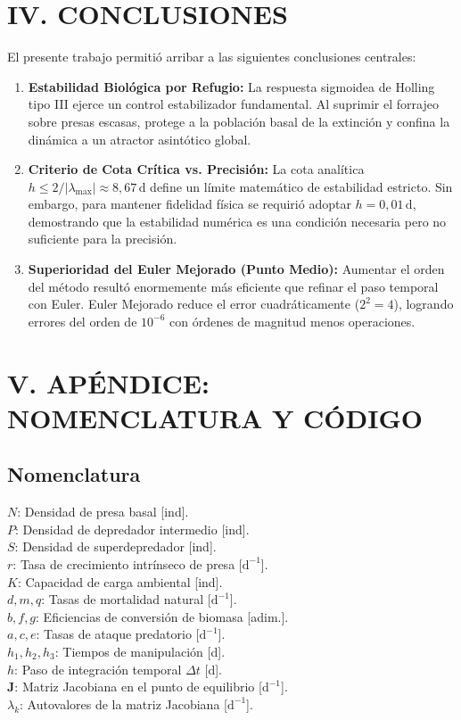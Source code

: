 \documentclass[10pt,twocolumn,a4paper]{article}
\begin{document}
\section{IV. CONCLUSIONES}
El presente trabajo permitió arribar a las siguientes conclusiones centrales:
\begin{enumerate}
  \item \textbf{Estabilidad Biológica por Refugio:} La respuesta sigmoidea de Holling tipo III ejerce un control estabilizador fundamental. Al suprimir el forrajeo sobre presas escasas, protege a la población basal de la extinción y confina la dinámica a un atractor asintótico global.
  \item \textbf{Criterio de Cota Crítica vs. Precisión:} La cota analítica $h \le 2/|\lambda_{\max}| \approx 8{,}67\,\text{d}$ define un límite matemático de estabilidad estricto. Sin embargo, para mantener fidelidad física se requirió adoptar $h = 0{,}01\,\text{d}$, demostrando que la estabilidad numérica es una condición necesaria pero no suficiente para la precisión.
  \item \textbf{Superioridad del Euler Mejorado (Punto Medio):} Aumentar el orden del método resultó enormemente más eficiente que refinar el paso temporal con Euler. Euler Mejorado reduce el error cuadráticamente ($2^2 = 4$), logrando errores del orden de $10^{-6}$ con órdenes de magnitud menos operaciones.
\end{enumerate}

\section{V. APÉNDICE: NOMENCLATURA Y CÓDIGO}
\subsection{Nomenclatura}
\noindent $N$: Densidad de presa basal [ind].\\
$P$: Densidad de depredador intermedio [ind].\\
$S$: Densidad de superdepredador [ind].\\
$r$: Tasa de crecimiento intrínseco de presa [$\text{d}^{-1}$].\\
$K$: Capacidad de carga ambiental [ind].\\
$d, m, q$: Tasas de mortalidad natural [$\text{d}^{-1}$].\\
$b, f, g$: Eficiencias de conversión de biomasa [adim.].\\
$a, c, e$: Tasas de ataque predatorio [$\text{d}^{-1}$].\\
$h_1, h_2, h_3$: Tiempos de manipulación [d].\\
$h$: Paso de integración temporal $\Delta t$ [d].\\
$\mathbf{J}$: Matriz Jacobiana en el punto de equilibrio [$\text{d}^{-1}$].\\
$\lambda_k$: Autovalores de la matriz Jacobiana [$\text{d}^{-1}$].
\end{document}
